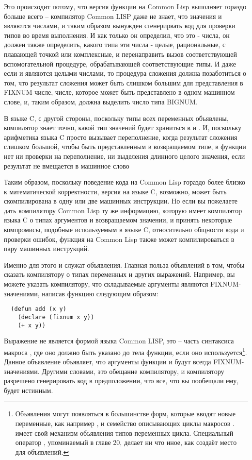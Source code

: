 Это происходит потому, что версия функции на Common Lisp выполняет гораздо больше всего --
компилятор Common LISP даже не знает, что значения  и  являются числами, и
таким образом вынужден сгенерирвать код для проверки типов во время выполнения. И как
только он определил, что это - числа, он должен также определить, какого типа эти числа -
целые, рациональные, с плавающей точкой или комплексные, и перенаправить вызов
соответствующей вспомогательной процедуре, обрабатывающей соответствующие типы. И даже
если  и  являются целыми числами, то процедура сложения должна
позаботиться о том, что результат сложения может быть слишком большим для представления в
FIXNUM-числе, числе, которое может быть представлено в одном машинном слове, и, таким
образом, должна выделить число типа BIGNUM.

В языке C, с другой стороны, поскольку типы всех переменных объявлены, компилятор знает
точно, какой тип значений будет храниться в  и . И, поскольку арифметика
языка C просто вызывает переполнение, когда результат сложения слишком большой, чтобы быть
представленным в возвращаемом типе, в функции нет ни проверки на переполнение, ни
выделения длинного целого значения, если результат не вмещается в машинное слово

Таким образом, поскольку поведение кода на Common Lisp гораздо более близко к
математической корректности, версия на языке C, возможно, может быть скомпилирована в одну
или две машинных инструкции. Но если вы пожелаете дать компилятору Common Lisp ту же
информацию, которую имеет компилятор языка C о типах аргументов и возвращаемом значении, и
принять некоторые компромисы, подобные используемым в языке C, относительно общности кода
и проверки ошибок, функция на Common Lisp также может компилироваться в пару машинных
инструкций.

Именно для этого и служат объявления. Главная польза объявлений в том, чтобы сказать компилятору о типах переменных и других выражений. Например, вы можете указать компилятору, что складываемые аргументы являются FIXNUM-значениями, написав функцию следующим образом:

\begin{lstlisting}
  (defun add (x y)
    (declare (fixnum x y))
    (+ x y))
\end{lstlisting}

Выражение  не является формой языка Common LISP, это -- часть синтаксиса
макроса , где оно должно быть указано до тела функции, если оно
используется\footnote{Объявления могут появляться в большинстве форм, которые вводят новые
  переменные, как например ,  и семейство описывающих циклы макросов
  .  имеет свой механизм объявления типов переменных
  цикла. Специальный оператор , упоминаемый в главе 20, делает ни что иное,
  как создаёт место для объявлений.}. Данное объявление объявляет, что аргументы функции
 и  будут всегда FIXNUM-значениями. Другими словами, это обещание
компилятору, и компилятору разрешено генерировать код в предположении, что все, что вы
пообещали ему, будет истинным.

